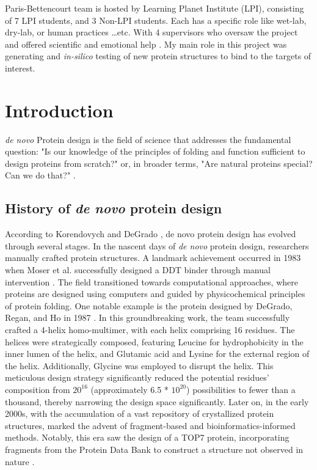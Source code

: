 \documentclass[11pt,a4paper]{article}
\begin{document}
Paris-Bettencourt team is hosted by Learning Planet Institute (LPI),
consisting of 7 LPI students, and 3 Non-LPI students.
Each has a specific role like wet-lab, dry-lab, or human practices \ldots etc. With 4 supervisors who oversaw the project and offered scientific and emotional help \cite{paris_bettencourt_team}.
My main role in this project was generating and \emph{in-silico} testing of new protein structures to bind to the targets of interest.


\section{Introduction}

\emph{de novo} Protein design is the field of science that addresses the 
fundamental question: "Is our knowledge of the principles of folding 
and function sufficient to design proteins from scratch?" 
\cite{korendovych2020novo} or, in broader terms, "Are natural proteins 
special? Can we do that?" \cite{hecht2018natural}.

\subsection{History of \emph{de novo} protein design}

According to Korendovych and DeGrado \cite{korendovych2020novo}, de 
novo protein design has evolved through several stages.
In the nascent days of \emph{de novo} protein design, researchers manually 
crafted protein structures. A landmark achievement occurred in 1983 
when Moser et al. successfully designed a DDT binder through manual 
intervention \cite{moser1983artificial}.
The field transitioned towards computational approaches, where proteins 
are designed using computers and guided by physicochemical principles 
of protein folding. One notable example is the protein designed by 
DeGrado, Regan, and Ho in 1987 \cite{degrado1987design}. In this 
groundbreaking work, the team successfully crafted a 4-helix 
homo-multimer, with each helix comprising 16 residues. The helices were 
strategically composed, featuring Leucine for hydrophobicity in the 
inner lumen of the helix, and Glutamic acid and Lysine for the external 
region of the helix. Additionally, Glycine was employed to disrupt the 
helix. This meticulous design strategy significantly reduced the 
potential residues' composition from $20^{16}$ (approximately 6.5 * $10^
{20}$) possibilities to fewer than a thousand, thereby narrowing the 
design space significantly. 
Later on, in the early 2000s, with the accumulation of a vast repository 
of crystallized protein structures,  marked the advent of 
fragment-based and bioinformatics-informed methods. Notably, this era 
saw the design of a  TOP7 protein, incorporating fragments from the 
Protein Data Bank to construct a structure not observed in nature \cite
{kuhlman2003design}.
\end{document}
